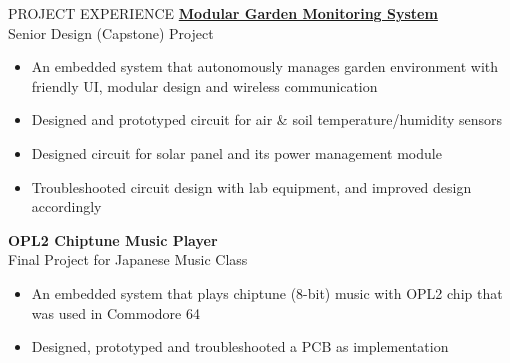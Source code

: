 \documentclass{../lib/resume} %
\begin{document}

    \begin{rSection}{PROJECT EXPERIENCE}
        \href{https://github.com/liu2z2/mgms}{\textbf{Modular Garden Monitoring System}} \\
        Senior Design (Capstone) Project
        \begin{itemize}
            \itemsep -4pt {}
            \item An embedded system that autonomously manages garden environment with friendly UI, modular design and wireless communication
            \item Designed and prototyped circuit for air \& soil temperature/humidity sensors
            \item Designed circuit for solar panel and its power management module
            \item Troubleshooted circuit design with lab equipment, and improved design accordingly
        \end{itemize}

        \textbf{OPL2 Chiptune Music Player} \\
        Final Project for Japanese Music Class
        \begin{itemize}
            \itemsep -4pt {}
            \item An embedded system that plays chiptune (8-bit) music with OPL2 chip that was used in Commodore 64
            \item Designed, prototyped and troubleshooted a PCB as implementation
        \end{itemize}

    \end{rSection}

%
%
%
%
%
\end{document}

